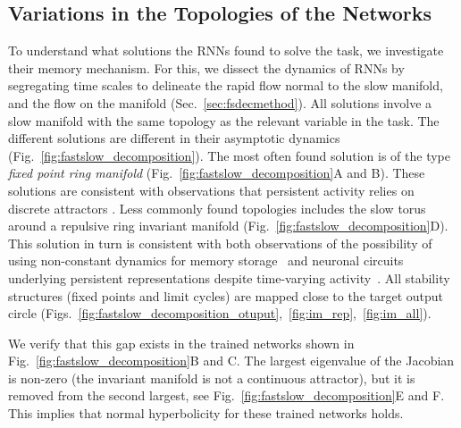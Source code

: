 \documentclass{article} %
\newcounter{ct}
\theoremstyle{definition}
\theoremstyle{remark}
\begin{document}
\subsection{Variations in the Topologies of the Networks}\label{sec:topologies}
To understand what solutions the RNNs found to solve the task, we investigate their memory mechanism.
For this, we dissect the dynamics of RNNs by segregating time scales to delineate the rapid flow normal to the slow manifold, and the flow on the manifold (Sec.~\ref{sec:fsdecmethod}).
All solutions involve a slow manifold with the same topology as the relevant variable in the task.
The different solutions are different in their asymptotic dynamics (Fig.~\ref{fig:fastslow_decomposition}).
The most often found solution is of the type \emph{fixed point ring manifold} (Fig.~\ref{fig:fastslow_decomposition}A and B).
These solutions are consistent with observations that persistent activity relies on discrete attractors \citep{brody2003, inagaki2019}.
Less commonly found topologies includes the slow torus around a repulsive ring invariant manifold (Fig.~\ref{fig:fastslow_decomposition}D).
This solution in turn is consistent with both observations of the possibility of using non-constant dynamics for memory storage~\citep{hirsch1995computing, Park2023a} and neuronal circuits underlying persistent representations despite time-varying activity~\citep{druckmann2012neuronal}.
All stability structures (fixed points and limit cycles) are mapped close to the target output circle (Figs.~\ref{fig:fastslow_decomposition_otuput},~\ref{fig:im_rep},~\ref{fig:im_all}).




We verify that this gap exists in the trained networks shown in Fig.~\ref{fig:fastslow_decomposition}B and C.
The largest  eigenvalue of the Jacobian is non-zero (the invariant manifold is not a continuous attractor), but it is removed from the second largest, see Fig.~\ref{fig:fastslow_decomposition}E and F.
This implies that normal hyperbolicity for these trained networks holds.
\end{document}
